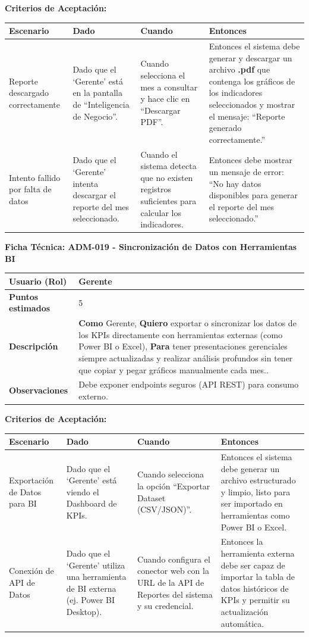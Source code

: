 \noindent
\textbf{Criterios de Aceptación:}
\footnotesize
\begin{longtable}{|p{}|p{}|p{}|p{}|}
\hline
\textbf{Escenario} & \textbf{Dado} & \textbf{Cuando} & \textbf{Entonces} \\ \hline
\endhead
Reporte descargado correctamente & Dado que el `Gerente' está en la pantalla de “Inteligencia de Negocio”. & Cuando selecciona el mes a consultar y hace clic en “Descargar PDF”. & Entonces el sistema debe generar y descargar un archivo \textbf{.pdf} que contenga los gráficos de los indicadores seleccionados y mostrar el mensaje: “Reporte generado correctamente.” \\ \hline
Intento fallido por falta de datos & Dado que el `Gerente' intenta descargar el reporte del mes seleccionado. & Cuando el sistema detecta que no existen registros suficientes para calcular los indicadores. & Entonces debe mostrar un mensaje de error: “No hay datos disponibles para generar el reporte del mes seleccionado.” \\ \hline
\end{longtable}
\normalsize

\noindent
\textbf{Ficha Técnica: ADM-019 - Sincronización de Datos con Herramientas BI}
\footnotesize
\begin{longtable}{|p{}|p{}|}
\hline
\textbf{Usuario (Rol)} & Gerente \\ \hline
\textbf{Puntos estimados} & 5 \\ \hline
\textbf{Descripción} & \textbf{Como} Gerente, \textbf{Quiero} exportar o sincronizar los datos de los KPIs directamente con herramientas externas (como Power BI o Excel), \textbf{Para} tener presentaciones gerenciales siempre actualizadas y realizar análisis profundos sin tener que copiar y pegar gráficos manualmente cada mes.. \\ \hline
\textbf{Observaciones} & Debe exponer endpoints seguros (API REST) para consumo externo. \\ \hline
\end{longtable}
\normalsize

\noindent
\textbf{Criterios de Aceptación:}
\footnotesize
\begin{longtable}{|p{}|p{}|p{}|p{}|}
\hline
\textbf{Escenario} & \textbf{Dado} & \textbf{Cuando} & \textbf{Entonces} \\ \hline
\endhead
Exportación de Datos para BI & Dado que el `Gerente' está viendo el Dashboard de KPIs. & Cuando selecciona la opción ``Exportar Dataset (CSV/JSON)''. & Entonces el sistema debe generar un archivo estructurado y limpio, listo para ser importado en herramientas como Power BI o Excel. \\ \hline
Conexión de API de Datos & Dado que el `Gerente' utiliza una herramienta de BI externa (ej. Power BI Desktop). & Cuando configura el conector web con la URL de la API de Reportes del sistema y su credencial. & Entonces la herramienta externa debe ser capaz de importar la tabla de datos históricos de KPIs y permitir su actualización automática. \\ \hline
\end{longtable}
\normalsize

